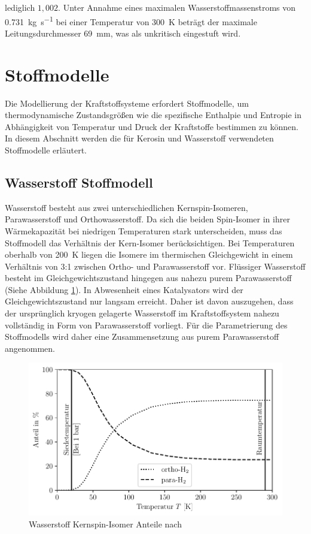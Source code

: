 lediglich $1,002$. Unter Annahme eines maximalen Wasserstoffmassenstroms von \SI{0.731}{\kg\per\s} bei einer Temperatur von \SI{300}{\K} beträgt der maximale Leitungsdurchmesser \SI{69}{\milli\m}, was als unkritisch eingestuft wird.

\section{Stoffmodelle}

Die Modellierung der Kraftstoffsysteme erfordert Stoffmodelle, um thermodynamische Zustandsgrößen wie die spezifische Enthalpie und Entropie in Abhängigkeit von Temperatur und Druck der Kraftstoffe bestimmen zu können. In diesem Abschnitt werden die für Kerosin und Wasserstoff verwendeten Stoffmodelle erläutert.

\subsection{Wasserstoff Stoffmodell}

Wasserstoff besteht aus zwei unterschiedlichen Kernspin-Isomeren, Parawasserstoff und Orthowasserstoff. Da sich die beiden Spin-Isomer in ihrer Wärmekapazität bei niedrigen Temperaturen stark unterscheiden, muss das Stoffmodell das Verhältnis der Kern-Isomer berücksichtigen. Bei Temperaturen oberhalb von \SI{200}{\K} liegen die Isomere im thermischen Gleichgewicht in einem Verhältnis von 3:1 zwischen Ortho- und Parawasserstoff vor. Flüssiger Wasserstoff besteht im Gleichgewichtszustand hingegen aus nahezu purem Parawasserstoff (Siehe Abbildung \ref{fig:spin}). In Abwesenheit eines Katalysators wird der Gleichgewichtszustand nur langsam erreicht. Daher ist davon auszugehen, dass der ursprünglich kryogen gelagerte Wasserstoff im Kraftstoffsystem nahezu vollständig in Form von Parawasserstoff vorliegt. Für die Parametrierung des Stoffmodells wird daher eine Zusammensetzung aus purem Parawasserstoff angenommen. \cite{Buntkowsky.2022}

\begin{figure}[ht]
	\centering
	\includegraphics[width=1\linewidth]{4_Abbildungen/2_Hauptteil/spin.pdf}
	\caption{Wasserstoff Kernspin-Isomer Anteile nach \cite{Buntkowsky.2022}}
	\label{fig:spin}
\end{figure}
\FloatBarrier 

